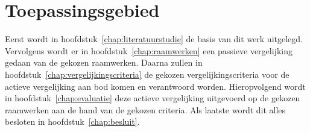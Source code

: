 \section{Toepassingsgebied} %

Eerst wordt in hoofdstuk~\ref{chap:literatuurstudie} de basis van dit werk uitgelegd.
Vervolgens wordt er in hoofdstuk~\ref{chap:raamwerken} een passieve vergelijking gedaan van de gekozen raamwerken.
Daarna zullen in hoofdstuk~\ref{chap:vergelijkingscriteria} de gekozen vergelijkingscriteria voor de actieve vergelijking aan bod komen en verantwoord worden.
Hieropvolgend wordt in hoofdstuk~\ref{chap:evaluatie} deze actieve vergelijking uitgevoerd op de gekozen raamwerken aan de hand van de gekozen criteria.
Als laatste wordt dit alles besloten in hoofdstuk~\ref{chap:besluit}.

